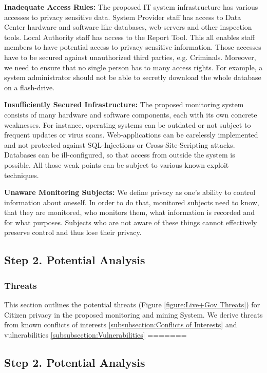 \textbf{Inadequate Access Rules:}
The proposed IT system infrastructure has various accesses to privacy sensitive data.
System Provider staff has access to Data Center hardware and software like databases, web-servers and other inspection tools.
Local Authority staff has access to the Report Tool.
This all enables staff members to have potential access to privacy sensitive information.
Those accesses have to be secured against unauthorized third parties, e.g. Criminals.
Moreover, we need to ensure that no single person has to many access rights.
For example, a system administrator should not be able to secretly download the whole database on a flash-drive.

\textbf{Insufficiently Secured Infrastructure:}
The proposed monitoring system consists of many hardware and software components, each with its own concrete weaknesses.
For instance, operating systems can be outdated or not subject to frequent updates or virus scans.
Web-applications can be carelessly implemented and not protected against SQL-Injections or Cross-Site-Scripting attacks.
Databases can be ill-configured, so that access from outside the system is possible.
All those weak points can be subject to various known exploit techniques.

\textbf{Unaware Monitoring Subjects:}
We define privacy as one's ability to control information about oneself. 
In order to do that, monitored subjects need to know, that they are monitored, who monitors them, what information is recorded and for what purposes.
Subjects who are not aware of these things cannot effectively preserve control and thus lose their privacy.




\subsection{Step 2. Potential Analysis}

\subsubsection{Threats}
This section outlines the potential threats (Figure \ref{figure:Live+Gov Threats}) for Citizen privacy in the proposed monitoring and mining System.
We derive threats from known conflicts of interests \ref{subsubsection:Conflicts of Interests} and vulnerabilities \ref{subsubsection:Vulnerabilities}
=======
\subsection{Step 2. Potential Analysis}

